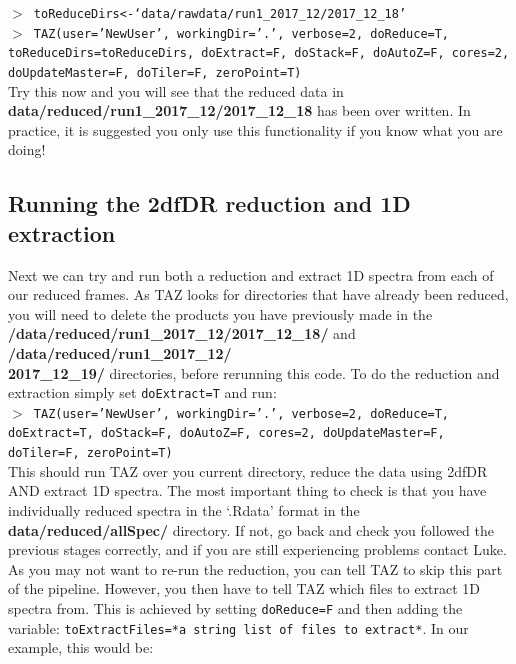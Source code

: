 \documentclass[12pt]{article}
\begin{document}
\hspace{10mm} \texttt{$>$ toReduceDirs<-`data/rawdata/run1\_2017\_12/2017\_12\_18'}\\
\hspace{10mm} \texttt{$>$ TAZ(user='NewUser', workingDir='.', verbose=2, doReduce=T, toReduceDirs=toReduceDirs, doExtract=F, doStack=F, doAutoZ=F, cores=2, doUpdateMaster=F, doTiler=F, zeroPoint=T)}\\

Try this now and you will see that the reduced data in \textbf{data/reduced/run1\_2017\_12/2017\_12\_18} has been over written. In practice, it is suggested you only use this functionality if you know what you are doing!
 

\subsection{Running the 2dfDR reduction and 1D extraction}

Next we can try and run both a reduction and extract 1D spectra from each of our reduced frames. As TAZ looks for directories that have already been reduced, you will need to delete the products you have previously made in the \textbf{/data/reduced/run1\_2017\_12/2017\_12\_18/} and \textbf{/data/reduced/run1\_2017\_12/ \\ 2017\_12\_19/} directories, before rerunning this code. To do the reduction and extraction simply set \texttt{doExtract=T} and run:\\

\hspace{10mm} \texttt{$>$ TAZ(user='NewUser', workingDir='.', verbose=2, doReduce=T, doExtract=T, doStack=F, doAutoZ=F, cores=2, doUpdateMaster=F, doTiler=F, zeroPoint=T)}\\

This should run TAZ over you current directory, reduce the data using 2dfDR AND extract 1D spectra. The most important thing to check is that you have individually reduced spectra in the `.Rdata' format in the \textbf{data/reduced/allSpec/} directory. If not, go back and check you followed the previous stages correctly, and if you are still experiencing problems contact Luke.  \\

As you may not want to re-run the reduction, you can tell TAZ to skip this part of the pipeline. However, you then have to tell TAZ which files to extract 1D spectra from. This is achieved by setting  \texttt{doReduce=F} and then adding the variable: \texttt{toExtractFiles=*a string list of files to extract*}. In our example, this would be:\\
\end{document}
